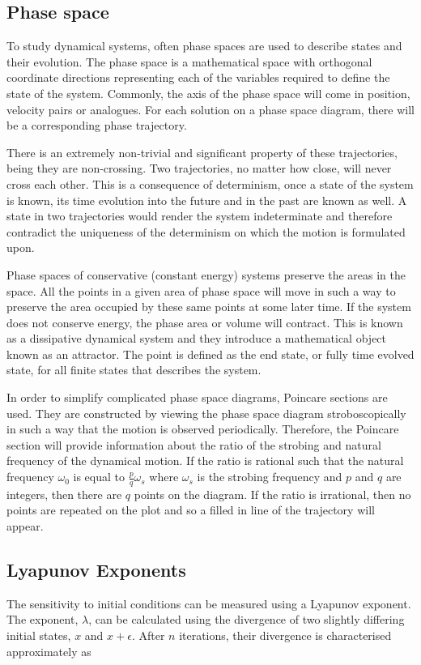\documentclass[aps,prl,reprint,10pt,amsmath,amssymb,superscriptaddress,a4paper]{revtex4-2}
\begin{document}
\subsection{Phase space}

To study dynamical systems, often phase spaces are used to describe states and their evolution. The phase space is a mathematical space with orthogonal coordinate 
directions representing each of the variables required to define the state of the system. Commonly, the axis of the phase space will come in position, velocity pairs 
or analogues. For each solution on a phase space diagram, there will be a corresponding phase trajectory. 

There is an extremely non-trivial and significant property 
of these trajectories, being they are non-crossing. Two trajectories, no matter how close, will never cross each other. This is a consequence of determinism, once a 
state of the system is known, its time evolution into the future and in the past are known as well. A state in two trajectories would render the system indeterminate 
and therefore contradict the uniqueness of the determinism on which the motion is formulated upon. 

Phase spaces of conservative (constant energy) systems preserve the areas in the space. All the points in a given area of phase space will move in such a way to preserve 
the area occupied by these same points at some later time. If the system does not conserve energy, the phase area or volume will contract. This is known as a dissipative 
dynamical system and they introduce a mathematical object known as an attractor. The point is defined as the end state, or fully time evolved state, for all finite states 
that describes the system.

In order to simplify complicated phase space diagrams, Poincare sections are used. They are constructed by viewing the phase space diagram stroboscopically in such a way that 
the motion is observed periodically. Therefore, the Poincare section will provide information about the ratio of the strobing and natural frequency of the dynamical motion. If 
the ratio is rational such that the natural frequency $\omega_0$ is equal to $\frac{p}{q}\omega_s$ where $\omega_s$ is the strobing frequency and $p$ and $q$ are integers, then 
there are $q$ points on the diagram. If the ratio is irrational, then no points are repeated on the plot and so a filled in line of the trajectory will appear.

\subsection{Lyapunov Exponents}
The sensitivity to initial conditions can be measured using a Lyapunov exponent. The exponent, $\lambda$, can be calculated using the divergence of two slightly differing 
initial states, $x$ and $x+\epsilon$. After $n$ iterations, their divergence is characterised approximately as \citep{baker}
\end{document}
